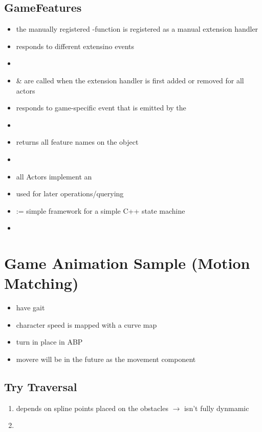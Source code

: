         \subsection{GameFeatures}
            \begin{itemize}
                \item the manually registered -function is registered as a manual extension handler
                \item responds to different extensino events
                \item {}
                \item {} \&  are called when the extension handler is first added or removed for all actors
                \item responds to game-specific  event that is emitted by the 
                \item 
                \item {} returns all feature names on the object
                \item 
                \item all Actors implement an 
                \item used for later operations/querying
                \item {} := simple framework for a simple C++ state machine
                \item 
            \end{itemize}

    \section{Game Animation Sample (Motion Matching)}

        

        \begin{itemize}
            \item have gait
            \item character speed is mapped with a curve map
            \item turn in place in ABP
            \item movere will be in the future as the movement component
        \end{itemize}



        \subsection{Try Traversal}
            \begin{enumerate}
                \item depends on spline points placed on the obstacles $\rightarrow$ isn't fully dynmamic
                \item 
            \end{enumerate}
            